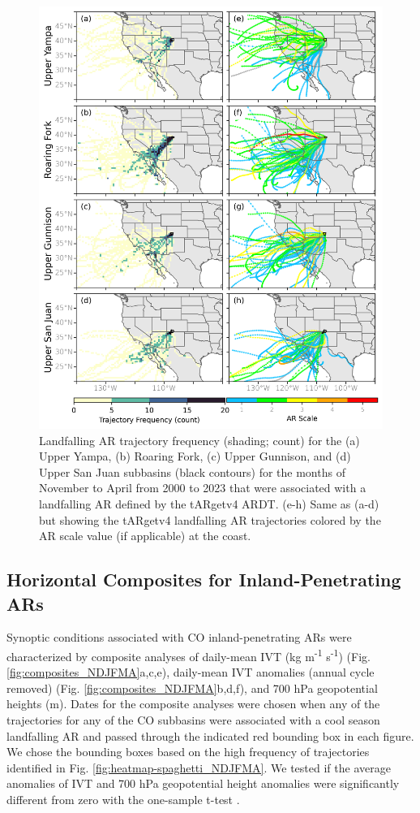 \documentclass[draft]{agujournal2019}
\begin{document}
\begin{figure}
\noindent\includegraphics[width=\textwidth, height=\textheight, keepaspectratio]{fig4.png}
\caption{Landfalling AR trajectory frequency (shading; count) for the (a) Upper Yampa, (b) Roaring Fork, (c) Upper Gunnison, and (d) Upper San Juan subbasins (black contours) for the months of November to April from 2000 to 2023 that were associated with a landfalling AR defined by the tARgetv4 ARDT. (e-h) Same as (a-d) but showing the tARgetv4 landfalling AR trajectories colored by the AR scale value (if applicable) at the coast.}
\label{fig:individual_subbasins}
\end{figure}

\subsection{Horizontal Composites for Inland-Penetrating ARs}
\label{sec:results:composite_analysis}

Synoptic conditions associated with CO inland-penetrating ARs were characterized by composite analyses of daily-mean IVT (kg m\textsuperscript{-1} s\textsuperscript{-1}) (Fig. \ref{fig:composites_NDJFMA}a,c,e), daily-mean IVT anomalies (annual cycle removed) (Fig. \ref{fig:composites_NDJFMA}b,d,f), and 700 hPa geopotential heights (m). Dates for the composite analyses were chosen when any of the trajectories for any of the CO subbasins were associated with a cool season landfalling AR and passed through the indicated red bounding box in each figure. We chose the bounding boxes based on the high frequency of trajectories identified in Fig. \ref{fig:heatmap-spaghetti_NDJFMA}. We tested if the average anomalies of IVT and 700 hPa geopotential height anomalies were significantly different from zero with the one-sample t-test \cite{WILKS2019ch5statistics}. 
\end{document}
